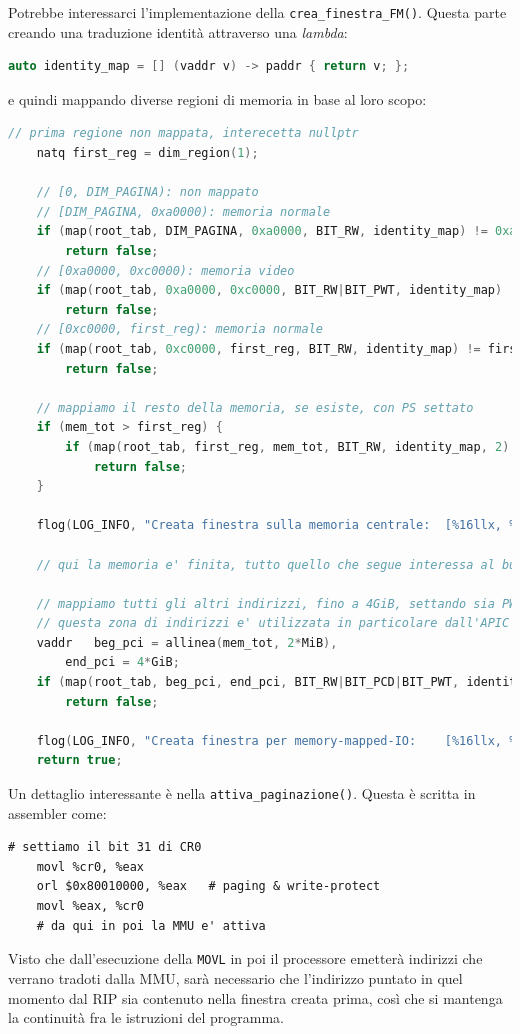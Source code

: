 \documentclass[a4paper,11pt]{article}
\begin{document}
Potrebbe interessarci l'implementazione della \lstinline|crea_finestra_FM()|.
Questa parte creando una traduzione identità attraverso una \textit{lambda}:
\begin{lstlisting}[language=C++, style=codestyle]	
auto identity_map = [] (vaddr v) -> paddr { return v; };
\end{lstlisting}
e quindi mappando diverse regioni di memoria in base al loro scopo:
\begin{lstlisting}[language=C++, style=codestyle]	
	// prima regione non mappata, interecetta nullptr
	natq first_reg = dim_region(1);

	// [0, DIM_PAGINA): non mappato
	// [DIM_PAGINA, 0xa0000): memoria normale
	if (map(root_tab, DIM_PAGINA, 0xa0000, BIT_RW, identity_map) != 0xa0000)
		return false;
	// [0xa0000, 0xc0000): memoria video
	if (map(root_tab, 0xa0000, 0xc0000, BIT_RW|BIT_PWT, identity_map) != 0xc0000)
		return false;
	// [0xc0000, first_reg): memoria normale
	if (map(root_tab, 0xc0000, first_reg, BIT_RW, identity_map) != first_reg)
		return false;

	// mappiamo il resto della memoria, se esiste, con PS settato
	if (mem_tot > first_reg) {
		if (map(root_tab, first_reg, mem_tot, BIT_RW, identity_map, 2) != mem_tot)
			return false;
	}

	flog(LOG_INFO, "Creata finestra sulla memoria centrale:  [%16llx, %16llx)", DIM_PAGINA, mem_tot);
	
	// qui la memoria e' finita, tutto quello che segue interessa al bus PCI

	// mappiamo tutti gli altri indirizzi, fino a 4GiB, settando sia PWT che PCD.
	// questa zona di indirizzi e' utilizzata in particolare dall'APIC per mappare i propri registri.
	vaddr	beg_pci = allinea(mem_tot, 2*MiB),
		end_pci = 4*GiB;
	if (map(root_tab, beg_pci, end_pci, BIT_RW|BIT_PCD|BIT_PWT, identity_map, 2) != end_pci)
		return false;

	flog(LOG_INFO, "Creata finestra per memory-mapped-IO:    [%16llx, %16llx)", beg_pci, end_pci);
	return true;
\end{lstlisting}

Un dettaglio interessante è nella \lstinline|attiva_paginazione()|.
Questa è scritta in assembler come:
\begin{lstlisting}[language=aSSembler, style=codestyle]	
# settiamo il bit 31 di CR0
	movl %cr0, %eax
	orl $0x80010000, %eax	# paging & write-protect
	movl %eax, %cr0
	# da qui in poi la MMU e' attiva
\end{lstlisting}
Visto che dall'esecuzione della \lstinline|MOVL| in poi il processore emetterà indirizzi che verrano tradoti dalla MMU, sarà necessario che l'indirizzo puntato in quel momento dal RIP sia contenuto nella finestra creata prima, così che si mantenga la continuità fra le istruzioni del programma.
\end{document}
